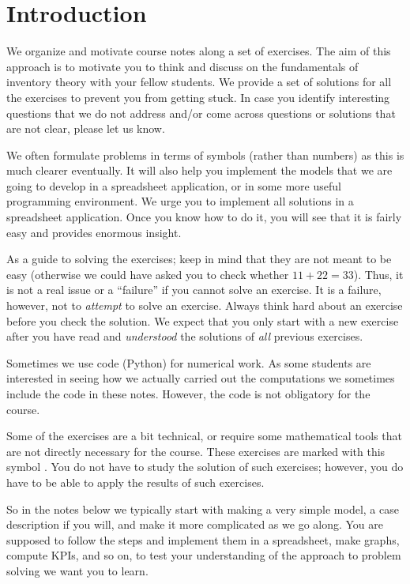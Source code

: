 \section{Introduction}
\label{sec:introduction}

We organize and motivate course notes along a set of exercises. The aim of this approach is to motivate you to think and discuss on the fundamentals of inventory theory with your fellow students. We provide a set of solutions for all the exercises to prevent you from getting stuck. In case you identify interesting questions that we do not address and/or come across questions or solutions that are not clear, please let us know. 

We often formulate problems in terms of symbols (rather than numbers) as this is much clearer eventually. It will also help you implement the models that we are going to develop in a spreadsheet application, or in some more useful programming environment. We urge you to implement all solutions in a spreadsheet application. Once you know how to do it, you will see that it is fairly easy and provides enormous insight.

As a guide to solving the exercises; keep in mind that they are not meant to be easy (otherwise we could have asked you to check whether $11+22=33$). Thus, it is not a real issue or a ``failure'' if you cannot solve an exercise. It is a failure, however, not to \emph{attempt} to solve an exercise. Always think hard about an exercise before you check the solution. We expect that  you only start with a new exercise after you have read and \emph{understood} the solutions of \emph{all} previous exercises. 

Sometimes we use code (Python) for numerical work. As some students
are interested in seeing how we actually carried out the computations
we sometimes include the code in these notes. However, the code is not
obligatory for the course.

Some of the exercises are a bit technical, or require some mathematical tools that are not directly necessary for the course. These exercises are marked with this symbol \faRocket. You do not have to study the solution of such exercises; however, you do have to be able to apply the results of such exercises.

So in the notes below we typically start with making a very simple model, a case description if you
will, and make it more complicated as we go along.  You are supposed
to follow the steps and implement them in a spreadsheet, make graphs, compute
KPIs, and so on, to test your understanding of the approach to problem
solving we want you to learn.

